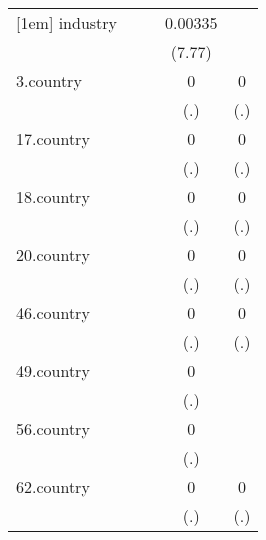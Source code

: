 {\begin{tabular}{l*{4}{c}}
[1em]
industry    &                     &                     &     0.00335\sym{***}&                     \\
            &                     &                     &      (7.77)         &                     \\
[1em]
3.country   &                     &                     &           0         &           0         \\
            &                     &                     &         (.)         &         (.)         \\
[1em]
17.country  &                     &                     &           0         &           0         \\
            &                     &                     &         (.)         &         (.)         \\
[1em]
18.country  &                     &                     &           0         &           0         \\
            &                     &                     &         (.)         &         (.)         \\
[1em]
20.country  &                     &                     &           0         &           0         \\
            &                     &                     &         (.)         &         (.)         \\
[1em]
46.country  &                     &                     &           0         &           0         \\
            &                     &                     &         (.)         &         (.)         \\
[1em]
49.country  &                     &                     &           0         &                     \\
            &                     &                     &         (.)         &                     \\
[1em]
56.country  &                     &                     &           0         &                     \\
            &                     &                     &         (.)         &                     \\
[1em]
62.country  &                     &                     &           0         &           0         \\
            &                     &                     &         (.)         &         (.)         \\

\end{tabular}}
